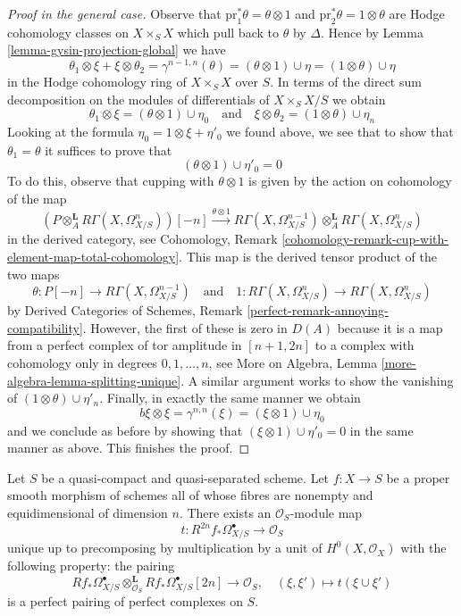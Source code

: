 \begin{proof}[Proof in the general case]
\medskip\noindent
Observe that $\text{pr}_1^*\theta = \theta \otimes 1$
and $\text{pr}_2^*\theta = 1 \otimes \theta$ are
Hodge cohomology classes on
$X \times_S X$ which pull back to $\theta$ by $\Delta$.
Hence by Lemma \ref{lemma-gysin-projection-global} we have
$$
\theta_1 \otimes \xi + \xi \otimes \theta_2 =
\gamma^{n - 1, n}(\theta) =
(\theta \otimes 1) \cup \eta =
(1 \otimes \theta) \cup \eta
$$
in the Hodge cohomology ring of $X \times_S X$ over $S$.
In terms of the direct sum decomposition on the modules
of differentials of $X \times_S X/S$ we obtain
$$
\theta_1 \otimes \xi =
(\theta \otimes 1) \cup \eta_0
\quad\text{and}\quad
\xi \otimes \theta_2 =
(1 \otimes \theta) \cup \eta_n
$$
Looking at the formula $\eta_0 = 1 \otimes \xi + \eta'_0$ we found above,
we see that to show that $\theta_1 = \theta$ it suffices to prove that
$$
(\theta \otimes 1) \cup \eta'_0 = 0
$$
To do this, observe that cupping with $\theta \otimes 1$ is given
by the action on cohomology of the map
$$
(P \otimes_A^\mathbf{L} R\Gamma(X, \Omega^n_{X/S}))[-n]
\xrightarrow{\theta \otimes 1}
R\Gamma(X, \Omega^{n - 1}_{X/S}) \otimes_A^\mathbf{L}
R\Gamma(X, \Omega^n_{X/S})
$$
in the derived category, see Cohomology, Remark
\ref{cohomology-remark-cup-with-element-map-total-cohomology}.
This map is the derived tensor product of the two maps
$$
\theta : P[-n] \to R\Gamma(X, \Omega^{n - 1}_{X/S})
\quad\text{and}\quad
1 : R\Gamma(X, \Omega^n_{X/S}) \to R\Gamma(X, \Omega^n_{X/S})
$$
by Derived Categories of Schemes, Remark
\ref{perfect-remark-annoying-compatibility}.
However, the first of these is zero in $D(A)$ because it is a map from
a perfect complex of tor amplitude in $[n + 1, 2n]$ to a complex
with cohomology only in degrees $0, 1, \ldots, n$, see
More on Algebra, Lemma \ref{more-algebra-lemma-splitting-unique}.
A similar argument works to show the vanishing of
$(1 \otimes \theta) \cup \eta'_n$. Finally, 
in exactly the same manner we obtain
$$
b \xi \otimes \xi = \gamma^{n, n}(\xi) = (\xi \otimes 1) \cup \eta_0
$$
and we conclude as before by showing that
$(\xi \otimes 1) \cup \eta'_0 = 0$ in the same manner as above.
This finishes the proof.
\end{proof}

\begin{proposition}
\label{proposition-relative-poincare-duality}
Let $S$ be a quasi-compact and quasi-separated scheme. Let $f : X \to S$
be a proper smooth morphism of schemes all of whose fibres are nonempty
and equidimensional of dimension $n$. There exists an
$\mathcal{O}_S$-module map
$$
t : R^{2n}f_*\Omega^\bullet_{X/S} \longrightarrow \mathcal{O}_S
$$
unique up to precomposing by multiplication by a unit of
$H^0(X, \mathcal{O}_X)$ with the following property: the pairing
$$
Rf_*\Omega^\bullet_{X/S}
\otimes_{\mathcal{O}_S}^\mathbf{L}
Rf_*\Omega^\bullet_{X/S}[2n]
\longrightarrow
\mathcal{O}_S, \quad
(\xi, \xi') \longmapsto t(\xi \cup \xi')
$$
is a perfect pairing of perfect complexes on $S$.
\end{proposition}

